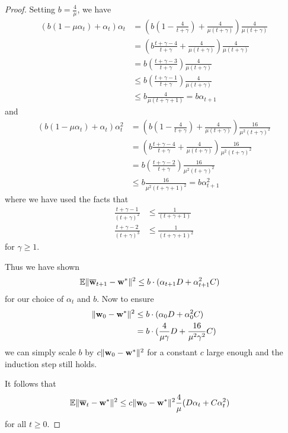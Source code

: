\begin{proof}
	Setting $b=\frac{4}{\mu}$, we have 
	\begin{align*}
	(b(1-\mu\alpha_{t})+\alpha_{t})\alpha_{t} & =\left(b(1-\frac{4}{t+\gamma})+\frac{4}{\mu(t+\gamma)}\right)\frac{4}{\mu(t+\gamma)}\\
	& =\left(b\frac{t+\gamma-4}{t+\gamma}+\frac{4}{\mu(t+\gamma)}\right)\frac{4}{\mu(t+\gamma)}\\
	& =b(\frac{t+\gamma-3}{t+\gamma})\frac{4}{\mu(t+\gamma)}\\
	& \leq b(\frac{t+\gamma-1}{t+\gamma})\frac{4}{\mu(t+\gamma)}\\
	& \leq b\frac{4}{\mu(t+\gamma+1)}=b\alpha_{t+1}
	\end{align*}
	and 
	\begin{align*}
	(b(1-\mu\alpha_{t})+\alpha_{t})\alpha_{t}^{2} & =\left(b(1-\frac{4}{t+\gamma})+\frac{4}{\mu(t+\gamma)}\right)\frac{16}{\mu^{2}(t+\gamma)^{2}}\\
	& =\left(b\frac{t+\gamma-4}{t+\gamma}+\frac{4}{\mu(t+\gamma)}\right)\frac{16}{\mu^{2}(t+\gamma)^{2}}\\
	& =b(\frac{t+\gamma-2}{t+\gamma})\frac{16}{\mu^{2}(t+\gamma)^{2}}\\
	& \leq b\frac{16}{\mu^{2}(t+\gamma+1)^{2}}=b\alpha_{t+1}^{2}
	\end{align*}
	where we have used the facts that 
	\begin{align*}
	\frac{t+\gamma-1}{(t+\gamma)^{2}} & \leq\frac{1}{(t+\gamma+1)}\\
	\frac{t+\gamma-2}{(t+\gamma)^{3}} & \leq\frac{1}{(t+\gamma+1)^{2}}
	\end{align*}
	for $\gamma\geq1$.
	
	Thus we have shown 
	\begin{align*}
	\mathbb{E}\|{\overline{\mathbf{w}}}_{t+1}-{\mathbf{w}}^{\ast}\|^{2} & \leq b\cdot(\alpha_{t+1}D+\alpha_{t+1}^{2}C)
	\end{align*}
	for our choice of $\alpha_{t}$ and $b$. Now to ensure 
	\begin{align*}
	\|{\mathbf{w}}_{0}-{\mathbf{w}}^{\ast}\|^{2} & \leq b\cdot(\alpha_{0}D+\alpha_{0}^{2}C)\\
	& =b\cdot(\frac{4}{\mu\gamma}D+\frac{16}{\mu^{2}\gamma^{2}}C)
	\end{align*}
	we can simply scale $b$ by $c\|{\mathbf{w}}_{0}-{\mathbf{w}}^{\ast}\|^{2}$ for a constant
	$c$ large enough and the induction step still holds. 
	
	It follows that 
	\begin{align*}
	\mathbb{E}\|{\overline{\mathbf{w}}}_{t}-{\mathbf{w}}^{\ast}\|^{2} & \leq c\|{\mathbf{w}}_{0}-{\mathbf{w}}^{\ast}\|^{2}\frac{4}{\mu}(D\alpha_{t}+C\alpha_{t}^{2})
	\end{align*}
	for all $t\geq0$. 
	

\end{proof}
